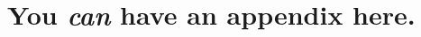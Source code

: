 \documentclass{article}
\theoremstyle{plain}
\theoremstyle{definition}
\theoremstyle{remark}
\begin{document}



\newpage
\appendix
\onecolumn
\section{You \emph{can} have an appendix here.}


\end{document}
